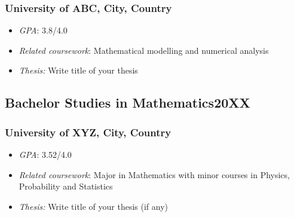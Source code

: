 \documentclass[11pt]{article}
\begin{document}
    \subsubsection{University of ABC,  City, Country}
    \begin{itemize}
        \item[\checkmark] \textit{GPA}: 3.8/4.0
        \item[\checkmark] \textit{Related coursework}: Mathematical modelling and numerical analysis
        \item[\checkmark] \textit{Thesis:} Write title of your thesis
        \end{itemize}
    \subsection{Bachelor Studies in Mathematics\hfill \normalfont 20XX}  
    
    \subsubsection{University of XYZ,  City, Country}
    \begin{itemize}
        \item[\checkmark] \textit{GPA}: 3.52/4.0
        \item[\checkmark] \textit{Related coursework}: Major in Mathematics with minor courses in Physics, Probability and Statistics
        \item[\checkmark] \textit{Thesis:} Write title of your thesis (if any)
        \end{itemize}
        
    
\end{document}
